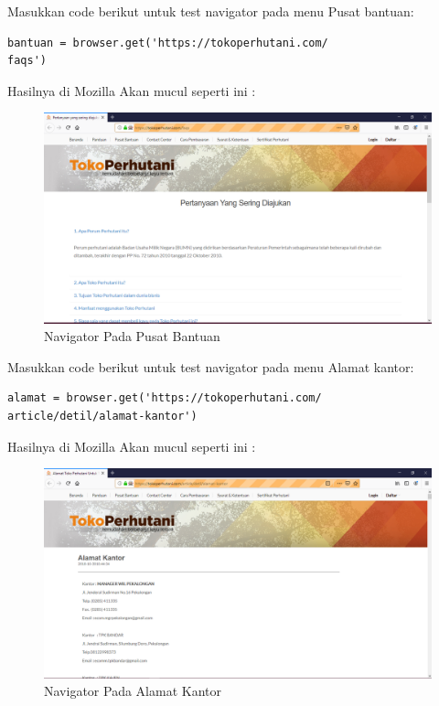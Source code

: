 Masukkan code berikut untuk test navigator pada menu  Pusat bantuan:
\begin{verbatim}
bantuan = browser.get('https://tokoperhutani.com/
faqs')
\end{verbatim}

Hasilnya  di Mozilla Akan mucul seperti ini :
\begin{figure}[h]
	\centering
	\includegraphics[scale=0.3]{figures/2hasil.PNG}
	\caption{Navigator Pada Pusat Bantuan}
\end{figure}

Masukkan code berikut untuk test navigator pada menu  Alamat kantor:
\begin{verbatim}
alamat = browser.get('https://tokoperhutani.com/
article/detil/alamat-kantor')
\end{verbatim}

Hasilnya  di Mozilla Akan mucul seperti ini :
\begin{figure}[h]
	\centering
	\includegraphics[scale=0.3]{figures/3hasil.PNG}
	\caption{Navigator Pada Alamat Kantor}
\end{figure}
\\

